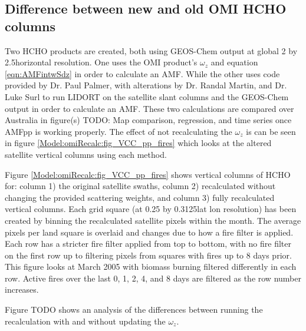   \subsection{Difference between new and old OMI HCHO columns}
  
    
    Two HCHO products are created, both using GEOS-Chem output at global 2 by 2.5\degr horizontal resolution.
    One uses the OMI product's $\omega_z$ and equation \ref{eqn:AMFintwSdz} in order to calculate an AMF.
    While the other uses code provided by Dr. Paul Palmer, with alterations by Dr. Randal Martin, and Dr. Luke Surl to run LIDORT on the satellite slant columns and the GEOS-Chem output in order to calculate an AMF.
    These two calculations are compared over Australia in figure(s) TODO: Map comparison, regression, and time series once AMFpp is working properly.
    The effect of not recalculating the $\omega_z$ is can be seen in figure \ref{Model:omiRecalc:fig_VCC_pp_fires} which looks at the altered satellite vertical columns using each method.
    
    Figure \ref{Model:omiRecalc:fig_VCC_pp_fires} shows vertical columns of HCHO for: column 1) the original satellite swaths, column 2) recalculated without changing the provided scattering weights, and column 3) fully recalculated vertical columns. 
    Each grid square (at 0.25 by 0.3125\degr lat lon resolution) has been created by binning the recalculated satellite pixels within the month.
    The average pixels per land square is overlaid and changes due to how a fire filter is applied.
    Each row has a stricter fire filter applied from top to bottom, with no fire filter on the first row up to filtering pixels from squares with fires up to 8 days prior.
    This figure looks at March 2005 with biomass burning filtered differently in each row.
    Active fires over the last 0, 1, 2, 4, and 8 days are filtered as the row number increases.
    
    Figure TODO shows an analysis of the differences between running the recalculation with and without updating the $\omega_z$.
    
    
